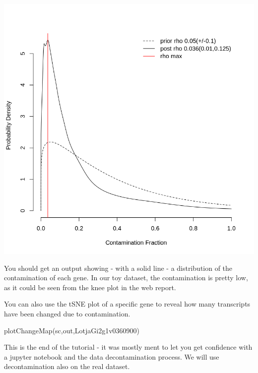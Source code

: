 \documentclass[
  letterpaper,
  DIV=11,
  numbers=noendperiod]{scrartcl}
\newenvironment{Shaded}{\begin{snugshade}}{\end{snugshade}}
\newcommand{\FunctionTok}[1]{\textcolor[rgb]{0.28,0.35,0.67}{#1}}
\newcommand{\NormalTok}[1]{\textcolor[rgb]{0.00,0.23,0.31}{#1}}
\newcommand{\StringTok}[1]{\textcolor[rgb]{0.13,0.47,0.30}{#1}}
\begin{document}
\includegraphics{Cleaningthedata.source_files/figure-pdf/cell-3-output-2.png}

You should get an output showing - with a solid line - a distribution of
the contamination of each gene. In our toy dataset, the contamination is
pretty low, as it could be seen from the knee plot in the web report.

You can also use the tSNE plot of a specific gene to reveal how many
transcripts have been changed due to contamination.

\begin{Shaded}
\begin{Highlighting}[]
\FunctionTok{plotChangeMap}\NormalTok{(sc,out,}\StringTok{\textquotesingle{}LotjaGi2g1v0360900\textquotesingle{}}\NormalTok{)}
\end{Highlighting}
\end{Shaded}

\begin{tcolorbox}[enhanced jigsaw, colbacktitle=quarto-callout-note-color!10!white, left=2mm, breakable, bottomtitle=1mm, colframe=quarto-callout-note-color-frame, opacityback=0, opacitybacktitle=0.6, toprule=.15mm, colback=white, toptitle=1mm, titlerule=0mm, arc=.35mm, title=\textcolor{quarto-callout-note-color}{\faInfo}\hspace{0.5em}{Wrapping Up}, bottomrule=.15mm, rightrule=.15mm, leftrule=.75mm, coltitle=black]

This is the end of the tutorial - it was mostly ment to let you get
confidence with a jupyter notebook and the data decontamination process.
We will use decontamination also on the real dataset.

\end{tcolorbox}
\end{document}
